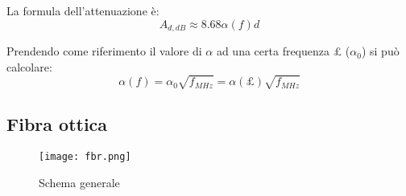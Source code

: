 \documentclass{article}
\begin{document}
\noindent La formula dell'attenuazione è:
$$A_{d,dB}\approx8.68\alpha(f)d$$\newline

\noindent Prendendo come riferimento il valore di $\alpha$ ad una certa frequenza £ ($\alpha_0$) si può calcolare:
$$\alpha(f)=\alpha_0\sqrt{f_{MHz}}=\alpha(\text{£})\sqrt{f_{MHz}}$$\newline

\subsection{Fibra ottica}

\begin{figure}[ht]
    \centering
    \texttt{[image: fbr.png]}
    \caption{Schema generale}
\end{figure}
\end{document}
